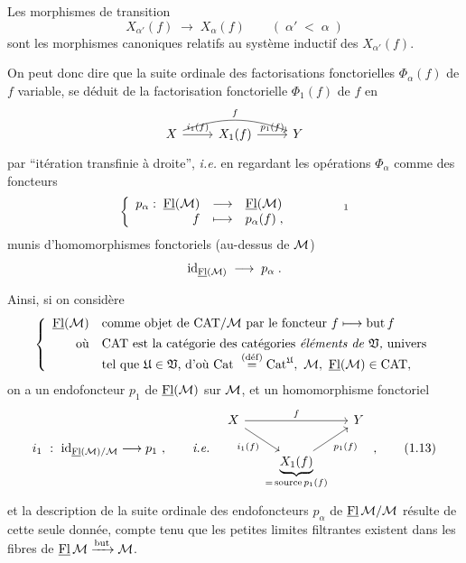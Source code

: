 Les morphismes de transition
\[
X_{\alpha'}(f) \;\longrightarrow\; X_\alpha(f) \qquad (\; \alpha' \;<\; \alpha \;)
\]
sont les morphismes canoniques relatifs au système inductif des $X_{\alpha'}(f)$.


On peut donc dire que la suite ordinale des factorisations fonctorielles $\Phi_\alpha(f)$ de $f$ variable, se déduit de la factorisation fonctorielle $\Phi_1(f)$ de $f$ en
\[
\begin{tikzcd}
X \arrow[r, "i_1(f)"] \arrow[rr, bend left=20, "f"] & X_1(f) \arrow[r, "p_1(f)"] & Y
\end{tikzcd}
\]
par “itération transfinie à droite”, \textit{i.e.} en regardant les opérations $\Phi_\alpha$ comme des foncteurs
\[
\left\{
\begin{array}{rcl}
p_\alpha :\; \uFl(\M) & \longrightarrow & \uFl(\M) \\
f & \longmapsto & p_\alpha(f) \;,
\end{array}
\right.
\qquad\qquad \text{\footnotemark}
\]
munis d'homomorphismes fonctoriels (au-dessus de $\mathcal{M}$)
\[
\mathrm{id}_{\underline{\mathrm{Fl}}(\mathcal{M})} \;\longrightarrow\; p_\alpha \;.
\]


Ainsi, si on considère
\[
\left\{
\begin{array}{rl}
\underline{\mathrm{Fl}}(\mathcal{M}) & \text{comme objet de CAT}/\mathcal{M} \text{ par le foncteur } f \longmapsto \text{but}\, f\\[1ex]
\text{où} & \text{CAT est la catégorie des catégories \textit{éléments de} } \mathfrak{V}\text{\textit{,} univers}\\
 & \text{tel que } \mathfrak{U} \in \mathfrak{V}\text{, d'où Cat } \overset{\text{(déf)}}{=} \mathrm{Cat}^{\mathfrak{U}},\ \mathcal{M},\ \underline{\mathrm{Fl}}(\mathcal{M}) \in \text{CAT} ,
\end{array}
\right.
\]
on a un endofoncteur $p_1$ de $\underline{\mathrm{Fl}}(\mathcal{M})$ sur $\mathcal{M}$, et un homomorphisme fonctoriel
\[
i_1 \ : \ \mathrm{id}_{\Flu(\cM)/\cM} \longrightarrow p_1 \ , \qquad \textit{i.e.} \quad
\begin{tikzcd}[column sep=small]
X \arrow[rr, "f"] \arrow[dr, "i_1(f)"'] & & Y \\
 & \underbrace{X_1(f)}_{=\,\text{source}\, p_1(f)} \arrow[ur, "p_1(f)"'] &
\end{tikzcd} \ ,
\tag*{(1.13)}
\]
et la description de la suite ordinale des endofoncteurs $p_\alpha$ de $\underline{\mathrm{Fl}}\,\mathcal{M}/\mathcal{M}$ résulte de cette seule donnée, compte tenu que les petites limites filtrantes existent dans les fibres de $\underline{\mathrm{Fl}}\,\mathcal{M} \xrightarrow{\text{but}} \mathcal{M}$.

